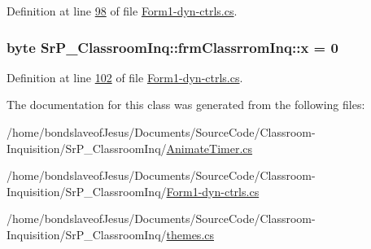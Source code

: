 \-Definition at line \hyperlink{_form1-dyn-ctrls_8cs_source_l00098}{98} of file \hyperlink{_form1-dyn-ctrls_8cs_source}{\-Form1-\/dyn-\/ctrls.\-cs}.

\hypertarget{class_sr_p___classroom_inq_1_1frm_classrrom_inq_ab6836b7a465c2251301a02d9da5c3c31}{
\subsubsection[{x}]{\setlength{\rightskip}{0pt plus 5cm}byte {\bf \-Sr\-P\-\_\-\-Classroom\-Inq\-::frm\-Classrrom\-Inq\-::x} = 0}}
\label{class_sr_p___classroom_inq_1_1frm_classrrom_inq_ab6836b7a465c2251301a02d9da5c3c31}


\-Definition at line \hyperlink{_form1-dyn-ctrls_8cs_source_l00102}{102} of file \hyperlink{_form1-dyn-ctrls_8cs_source}{\-Form1-\/dyn-\/ctrls.\-cs}.



\-The documentation for this class was generated from the following files\-:\begin{DoxyCompactItemize}
\item 
/home/bondslaveof\-Jesus/\-Documents/\-Source\-Code/\-Classroom-\/\-Inquisition/\-Sr\-P\-\_\-\-Classroom\-Inq/\hyperlink{_animate_timer_8cs}{\-Animate\-Timer.\-cs}\item 
/home/bondslaveof\-Jesus/\-Documents/\-Source\-Code/\-Classroom-\/\-Inquisition/\-Sr\-P\-\_\-\-Classroom\-Inq/\hyperlink{_form1-dyn-ctrls_8cs}{\-Form1-\/dyn-\/ctrls.\-cs}\item 
/home/bondslaveof\-Jesus/\-Documents/\-Source\-Code/\-Classroom-\/\-Inquisition/\-Sr\-P\-\_\-\-Classroom\-Inq/\hyperlink{themes_8cs}{themes.\-cs}\end{DoxyCompactItemize}
